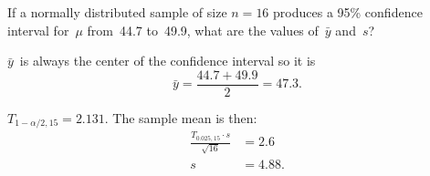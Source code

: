 \begin{problem}
  If a normally distributed sample of size ${n = 16}$ produces a 95\% confidence interval for~$\mu$ from~44.7 to~49.9, what are the values of~$\bar{y}$ and~$s$?
\end{problem}

$\bar{y}$~is always the center of the confidence interval so it is
\begin{equation}
  \bar{y} = \frac{44.7 + 49.9}{2} = \boxed{47.3}\text{.}
\end{equation}

${T_{1-\alpha/2,15} = 2.131}$.  The sample mean is then:
\begin{align}
  \frac{T_{0.025,15} \cdot s}{\sqrt{16}} &= 2.6 \\
  s &= \boxed{4.88} \text{.}
\end{align}
